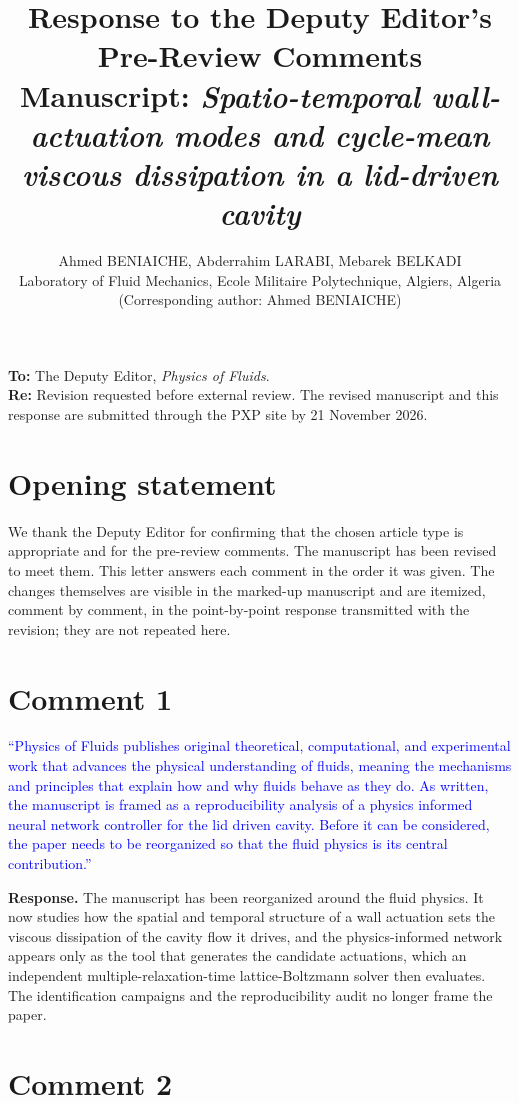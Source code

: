 \documentclass[11pt,a4paper]{article}
\title{\bfseries Response to the Deputy Editor's Pre-Review Comments\\[6pt]
\normalsize Manuscript: \textit{Spatio-temporal wall-actuation modes and
cycle-mean viscous dissipation in a lid-driven cavity}}
\author{Ahmed BENIAICHE, Abderrahim LARABI, Mebarek BELKADI\\
Laboratory of Fluid Mechanics, Ecole Militaire Polytechnique, Algiers, Algeria\\
(Corresponding author: Ahmed BENIAICHE)}
\date{}
\begin{document}
\maketitle
\vspace{-2.5em}

\noindent\textbf{To:} The Deputy Editor, \textit{Physics of Fluids}.\\
\textbf{Re:} Revision requested before external review. The revised manuscript
and this response are submitted through the PXP site by 21 November 2026.

\section*{Opening statement}

We thank the Deputy Editor for confirming that the chosen article type is
appropriate and for the pre-review comments. The manuscript has been revised to
meet them. This letter answers each comment in the order it was given. The
changes themselves are visible in the marked-up manuscript and are itemized,
comment by comment, in the point-by-point response transmitted with the
revision; they are not repeated here.

\section*{Comment 1}

\noindent\textcolor{blue}{``Physics of Fluids publishes original theoretical,
computational, and experimental work that advances the physical understanding
of fluids, meaning the mechanisms and principles that explain how and why
fluids behave as they do. As written, the manuscript is framed as a
reproducibility analysis of a physics informed neural network controller for
the lid driven cavity. Before it can be considered, the paper needs to be
reorganized so that the fluid physics is its central contribution.''}

\textbf{Response.} The manuscript has been reorganized around the fluid
physics. It now studies how the spatial and temporal structure of a wall
actuation sets the viscous dissipation of the cavity flow it drives, and the
physics-informed network appears only as the tool that generates the candidate
actuations, which an independent multiple-relaxation-time lattice-Boltzmann
solver then evaluates. The identification campaigns and the reproducibility
audit no longer frame the paper.

\section*{Comment 2}
\end{document}

